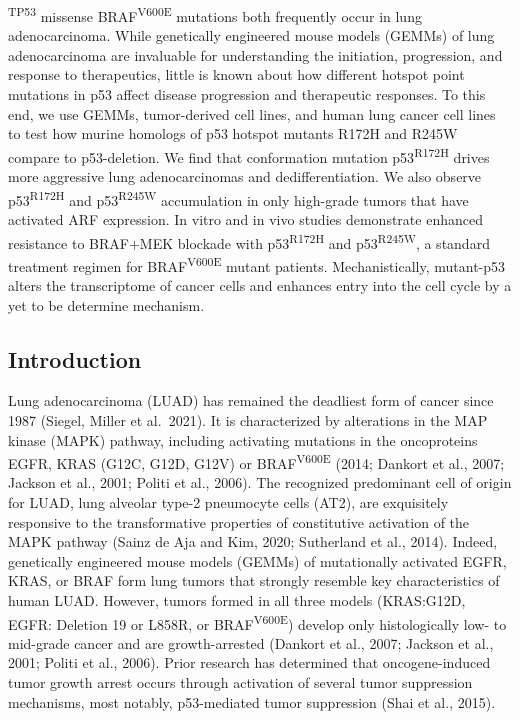 \textsuperscript{TP53} missense BRAF\textsuperscript{V600E} mutations both frequently occur in lung adenocarcinoma. While genetically engineered mouse models (GEMMs) of lung adenocarcinoma are invaluable for understanding the initiation, progression, and response to therapeutics, little is known about how different hotspot point mutations in p53 affect disease progression and therapeutic responses. To this end, we use GEMMs, tumor-derived cell lines, and human lung cancer cell lines to test how murine homologs of p53 hotspot mutants R172H and R245W compare to p53-deletion. We find that conformation mutation p53\textsuperscript{R172H} drives more aggressive lung adenocarcinomas and dedifferentiation. We also observe p53\textsuperscript{R172H} and p53\textsuperscript{R245W} accumulation in only high-grade tumors that have activated ARF expression. In vitro and in vivo studies demonstrate enhanced resistance to BRAF+MEK blockade with p53\textsuperscript{R172H} and p53\textsuperscript{R245W}, a standard treatment regimen for BRAF\textsuperscript{V600E} mutant patients. Mechanistically, mutant-p53 alters the transcriptome of cancer cells and enhances entry into the cell cycle by a yet to be determine mechanism.

\hypertarget{introduction-1}{%
\subsection{Introduction}\label{introduction-1}}

Lung adenocarcinoma (LUAD) has remained the deadliest form of cancer since 1987 (Siegel, Miller et al.~2021). It is characterized by alterations in the MAP kinase (MAPK) pathway, including activating mutations in the oncoproteins EGFR, KRAS (G12C, G12D, G12V) or BRAF\textsuperscript{V600E} (2014; Dankort et al., 2007; Jackson et al., 2001; Politi et al., 2006). The recognized predominant cell of origin for LUAD, lung alveolar type-2 pneumocyte cells (AT2), are exquisitely responsive to the transformative properties of constitutive activation of the MAPK pathway (Sainz de Aja and Kim, 2020; Sutherland et al., 2014). Indeed, genetically engineered mouse models (GEMMs) of mutationally activated EGFR, KRAS, or BRAF form lung tumors that strongly resemble key characteristics of human LUAD. However, tumors formed in all three models (KRAS:G12D, EGFR: Deletion 19 or L858R, or BRAF\textsuperscript{V600E}) develop only histologically low- to mid-grade cancer and are growth-arrested (Dankort et al., 2007; Jackson et al., 2001; Politi et al., 2006). Prior research has determined that oncogene-induced tumor growth arrest occurs through activation of several tumor suppression mechanisms, most notably, p53-mediated tumor suppression (Shai et al., 2015).

